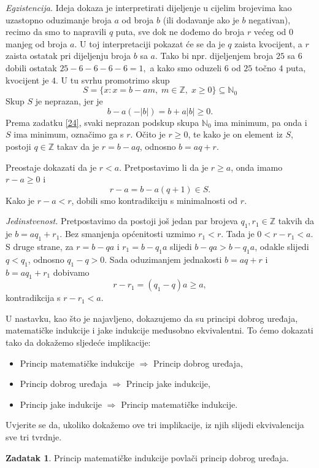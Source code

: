 \documentclass{book}
\renewenvironment{proof}{%
    \vspace{-\parskip}\begin{oldproof}%
    }{%
    \end{oldproof}%
}
\theoremstyle{definition}
\theoremstyle{definition}
\newtheorem{exercise}{Zadatak}
\theoremstyle{remark}
\begin{document}
\begin{proof}[Rješenje]
\textit{Egzistencija.} Ideja dokaza je interpretirati dijeljenje u cijelim brojevima kao uzastopno oduzimanje broja $a$ od broja $b$ (ili dodavanje ako je $b$ negativan), recimo da smo to napravili $q$ puta, sve dok ne dođemo do broja $r$ većeg od $0$ manjeg od broja $a$. U toj interpretaciji pokazat će se da je $q$ zaista kvocijent, a $r$ zaista ostatak pri dijeljenju broja $b$ sa $a$. Tako bi npr. dijeljenjem broja $25$ sa $6$ dobili ostatak $25-6-6-6-6=1,$ a kako smo oduzeli $6$ od $25$ točno $4$ puta, kvocijent je $4$. U tu svrhu promotrimo skup
$$S=\{x : x=b-am,\; m\in \mathbb{Z},\; x\geq 0\}\subseteq \mathbb{N}_0$$
Skup $S$ je neprazan, jer je $$b-a(-|b|)=b+a|b|\geq 0.$$ 
Prema zadatku \ref{24}, svaki neprazan podskup skupa $\mathbb{N}_0$ ima minimum, pa onda i $S$ ima minimum, označimo ga s $r$. Očito je $r\geq 0$, te kako je on element iz $S$, postoji $q\in \mathbb{Z}$ takav da je $r=b-aq$, odnosno $b=aq+r$. 

Preostaje dokazati da je $r<a$. Pretpostavimo li da je $r\geq a$, onda imamo $r-a\geq 0$ i $$r-a=b-a(q+1)\in S.$$ 
Kako je $r-a<r$, dobili smo kontradikciju s minimalnosti od $r$.

\textit{Jedinstvenost.} Pretpostavimo da postoji još jedan par brojeva $q_1, r_1\in \mathbb{Z}$ takvih da je $b=aq_1+r_1$. Bez smanjenja općenitosti uzmimo $r_1<r$. Tada je $0<r-r_1<a$. S druge strane, za $r=b-qa$ i $r_1=b-q_1a$ slijedi $b-qa>b-q_1a$, odakle slijedi $q<q_1$, odnosno $q_1-q>0$. Sada oduzimanjem jednakosti $b=aq+r$ i $b=aq_1+r_1$ dobivamo $$r-r_1=(q_1-q)a\geq a,$$ 
kontradikcija s $r-r_1<a$.
\end{proof}
U nastavku, kao što je najavljeno, dokazujemo da su principi dobrog uređaja, matematičke indukcije i jake indukcije međusobno ekvivalentni. To ćemo dokazati tako da dokažemo sljedeće implikacije:
\begin{itemize}
\item Princip matematičke indukcije $\Rightarrow$ Princip dobrog uređaja,
\item Princip dobrog uređaja $\Rightarrow$ Princip jake indukcije,
\item Princip jake indukcije $\Rightarrow$ Princip matematičke indukcije.
\end{itemize}
Uvjerite se da, ukoliko dokažemo ove tri implikacije, iz njih slijedi ekvivalencija sve tri tvrdnje.
\begin{exercise}
Princip matematičke indukcije povlači princip dobrog uređaja.
\end{exercise}
\end{document}
